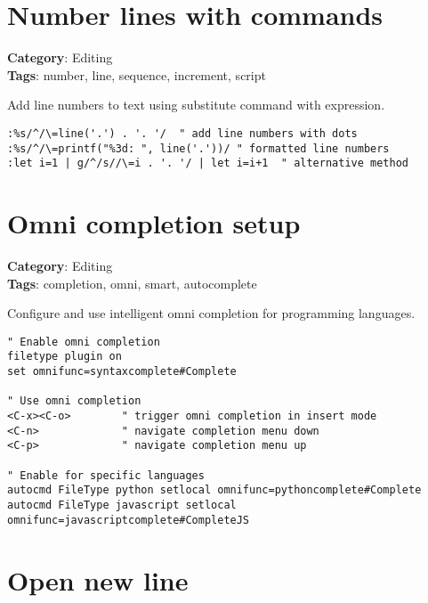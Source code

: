 {{{\section{Number lines with commands}

\textbf{Category}: Editing\\ \textbf{Tags}: number, line, sequence, increment, script
\vspace{0.5cm}

Add line numbers to text using substitute command with expression.

\begin{Exa*}{}
\begin{Verbatim}[fontsize=\footnotesize, breaklines, breakanywhere]
:%s/^/\=line('.') . '. '/  " add line numbers with dots
:%s/^/\=printf("%3d: ", line('.'))/ " formatted line numbers
:let i=1 | g/^/s//\=i . '. '/ | let i=i+1  " alternative method
\end{Verbatim}
\end{Exa*}

\section{Omni completion setup}

\textbf{Category}: Editing\\ \textbf{Tags}: completion, omni, smart, autocomplete
\vspace{0.5cm}

Configure and use intelligent omni completion for programming languages.

\begin{Exa*}{}
\begin{Verbatim}[fontsize=\footnotesize, breaklines, breakanywhere]
" Enable omni completion
filetype plugin on
set omnifunc=syntaxcomplete#Complete

" Use omni completion
<C-x><C-o>        " trigger omni completion in insert mode
<C-n>             " navigate completion menu down
<C-p>             " navigate completion menu up

" Enable for specific languages
autocmd FileType python setlocal omnifunc=pythoncomplete#Complete
autocmd FileType javascript setlocal omnifunc=javascriptcomplete#CompleteJS
\end{Verbatim}
\end{Exa*}

\section{Open new line}

}}}
